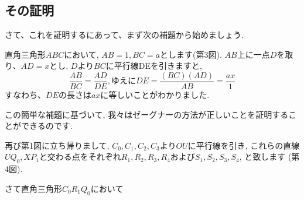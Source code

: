 \documentclass[11pt,a4paper]{jsarticle}
\begin{document}
\subsection{その証明}
さて、これを証明するにあって、まず次の補題から始めましょう.

直角三角形$ABC$において, $AB=1, BC=a$とします(第3図). $AB$上に一点$D$を取り、$AD=x$とし, $D$より$BC$に平行線DEを引きますと,
\begin{equation}
\frac{AB}{BC}=\frac{AD}{DE}, ゆえに DE = \frac{(BC)(AD)}{AB}=\frac{ax}{1}
\end{equation}
すなわち、$DE$の長さは$ax$に等しいことがわかりました.

この簡単な補題に基づいて, 我々はゼーグナーの方法が正しいことを証明することができるのです.

再び第1図に立ち帰りまして, $C_0, C_1, C_2, C_3$より$OU$に平行線を引き, これらの直線$UQ_0, XP_1$と交わる点をそれぞれ$R_1, R_2, R_3, R_4$および$S_1,S_2,S_3,S_4$, と致します (第4図).

さて直角三角形$C_0R_1Q_0$において







%
%
\end{document}

